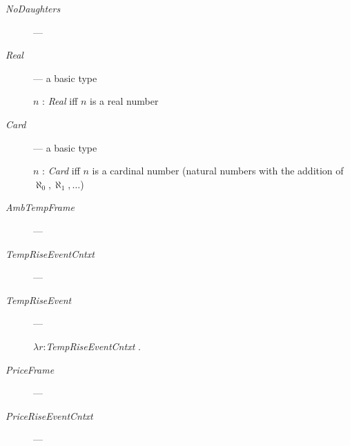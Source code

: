 \begin{description}
  
\item[\textnormal{\textit{NoDaughters}}] ---

  
\item[\textnormal{\textit{Real}}] --- a basic type

  $n$ : \textit{Real} iff $n$ is a real number

  
\item[\textnormal{\textit{Card}}] --- a basic type

  $n$ : \textit{Card} iff $n$ is a cardinal number (natural numbers
  with the addition of $\aleph_0, \aleph_1,\ldots$)
 

  

\item[\textnormal{\textit{AmbTempFrame}}] --- 

      
    \item[\textnormal{\textit{TempRiseEventCntxt}}] ---
      
    \item[\textnormal{\textit{TempRiseEvent}}] ---
      
      $\lambda r$:\textit{TempRiseEventCntxt} .\\  
\hspace*{2em}
      
    \item[\textnormal{\textit{PriceFrame}}] --- 
      
    \item[\textnormal{\textit{PriceRiseEventCntxt}}] --- 
 

\end{description}
